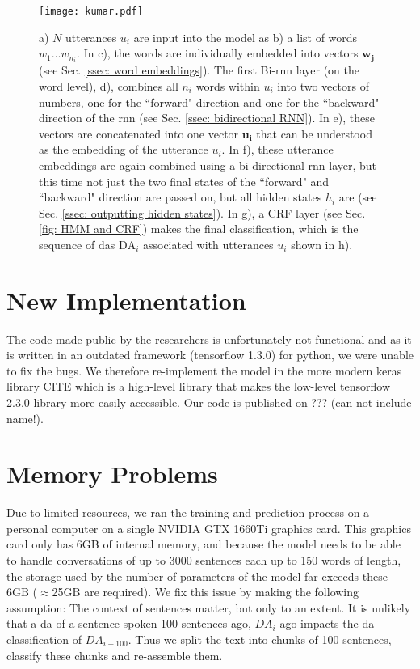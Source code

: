     \begin{figure}[h]
        \centering
        \texttt{[image: kumar.pdf]}
        \caption{a) $N$ \glspl{utterance} $u_i$ are input into the \gls{model} as b) a list of words $w_1 \dots w_{n_i}$. In c), the words are individually embedded into vectors $\mathbf{w_j}$ (see Sec. \ref{ssec: word embeddings}). The first Bi-\gls{rnn} layer (on the word level), d), combines all $n_i$ words within $u_i$ into two vectors of numbers, one for the ``forward" direction and one for the ``backward" direction of the \gls{rnn} (see Sec. \ref{ssec: bidirectional RNN}). In e), these vectors are concatenated into one vector $\mathbf{u_i}$ that can be understood as the \gls{embedding} of the \gls{utterance} $u_i$. In f), these \gls{utterance} \glspl{embedding} are again combined using a bi-directional \gls{rnn} layer, but this time not just the two final states of the ``forward" and ``backward" direction are passed on, but all hidden states $h_i$ are (see Sec. \ref{ssec: outputting hidden states}). In g), a CRF layer (see Sec. \ref{fig: HMM and CRF}) makes the final classification, which is the sequence of \glspl{da} $\text{DA}_i$ associated with \glspl{utterance} $u_i$ shown in h).}
        \label{fig:kumar_model}
    \end{figure}
        
    \section{New Implementation}
        The code made public by the researchers is unfortunately not functional and as it is written in an outdated framework (tensorflow 1.3.0) for python, we were unable to fix the bugs. We therefore re-implement the \gls{model} in the more modern keras library CITE which is a high-level library that makes the low-level tensorflow 2.3.0 library more easily accessible. Our code is published on ??? (can not include name!).
        
    \section{Memory Problems}
        Due to limited resources, we ran the training and prediction process on a personal computer on a single NVIDIA GTX 1660Ti graphics card. This graphics card only has 6GB of internal memory, and because the \gls{model} needs to be able to handle conversations of up to 3000 sentences each up to 150 words of length, the storage used by the number of parameters of the \gls{model} far exceeds these 6GB ($\approx$25GB are required). We fix this issue by making the following assumption: The context of sentences matter, but only to an extent. It is unlikely that a \gls{da} of a sentence spoken 100 sentences ago, $DA_{i}$ ago impacts the \gls{da} classification of  $DA_{i + 100}$. Thus we split the text into chunks of 100 sentences, classify these chunks and re-assemble them.
    

